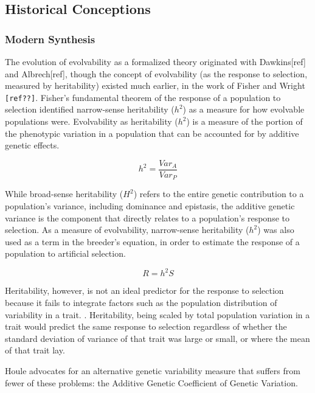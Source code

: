 \subsection{Historical Conceptions}
\subsubsection{Modern Synthesis}

The evolution of evolvability as a formalized theory originated with Dawkins[ref] and Albrech[ref], though the concept of evolvability (as the response to selection, measured by heritability) existed much earlier, in the work of Fisher\cite{fisher_genetical_1930}  and Wright \verb|[ref??]|.  Fisher’s fundamental theorem of the response of a population to selection identified narrow-sense heritability ($h^2$) as a measure for how evolvable populations were. Evolvability as heritability ($h^2$) is a measure of the portion of the phenotypic variation in a population that can be accounted for by additive genetic effects.

\begin{equation}
h^2 = \frac{Var_A}{Var_P}
\end{equation}

While broad-sense heritability ($H^2$) refers to the entire genetic contribution to a population’s variance, including dominance and epistasis, the additive genetic variance is the component that directly relates to a population’s response to selection.\cite{houle_comparing_1992} As a measure of evolvability, narrow-sense heritability ($h^2$) was also used as a term in the breeder’s equation, in order to estimate the response of a population to artificial selection.

\begin{equation}
R = {h^2}S
\end{equation}

Heritability, however, is not an ideal predictor for the response to selection because it fails to integrate factors such as the population distribution of variability in a trait. \cite{houle_comparing_1992}. Heritability, being scaled by total population variation in a trait would predict the same response to selection regardless of whether the standard deviation of variance of that trait was large or small, or where the mean of that trait lay.

Houle advocates for an alternative genetic variability measure that suffers from fewer of these problems: the Additive Genetic Coefficient of Genetic Variation.

